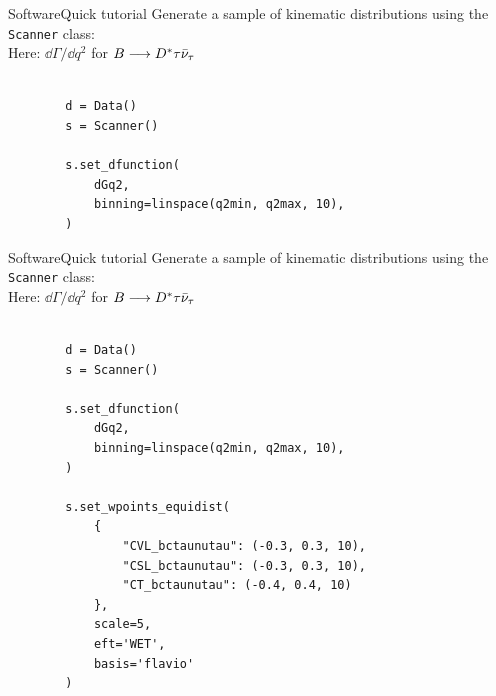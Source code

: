 \begin{frame}[t, fragile]{Software}{Quick tutorial}
    Generate a sample of kinematic distributions using the \texttt{Scanner} class:\\
    {\footnotesize Here: $\dd\Gamma/\dd q^2$ for $B\longrightarrow D^*\tau\bar\nu_\tau$}
    
    \begin{verbatim}
    
        d = Data()
        s = Scanner()
        
        s.set_dfunction(
            dGq2,
            binning=linspace(q2min, q2max, 10),
        )
    \end{verbatim}
\end{frame}

\begin{frame}[t, fragile]{Software}{Quick tutorial}
    Generate a sample of kinematic distributions using the \texttt{Scanner} class:\\
    {\footnotesize Here: $\dd\Gamma/\dd q^2$ for $B\longrightarrow D^*\tau\bar\nu_\tau$}
    
    \begin{verbatim}
    
        d = Data()
        s = Scanner()
        
        s.set_dfunction(
            dGq2,
            binning=linspace(q2min, q2max, 10),
        )
        
        s.set_wpoints_equidist(
            {
                "CVL_bctaunutau": (-0.3, 0.3, 10),
                "CSL_bctaunutau": (-0.3, 0.3, 10),
                "CT_bctaunutau": (-0.4, 0.4, 10)
            },
            scale=5,
            eft='WET',
            basis='flavio'
        )
    \end{verbatim}
\end{frame}


